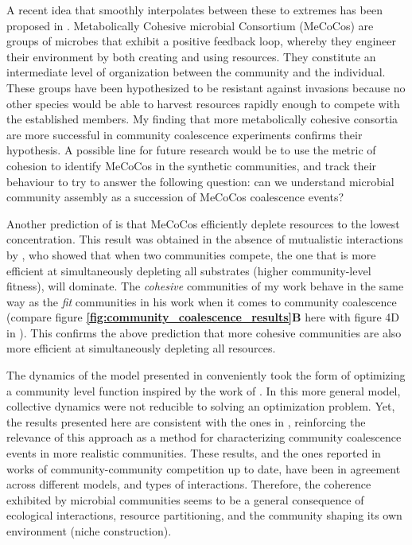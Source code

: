 \documentclass[titlepage,11pt]{article}
\begin{document}
\begin{linenumbers}
			A recent idea that smoothly interpolates between these to extremes has been proposed in \citep{Pascual-Garcia2020}. Metabolically Cohesive microbial Consortium (MeCoCos) are groups of microbes that exhibit a positive feedback loop, whereby they engineer their environment by both creating and using resources. They constitute an intermediate level of organization between the community and the individual. These groups have been hypothesized to be resistant against invasions because no other species would be able to harvest resources rapidly enough to compete with the established members. My finding that more metabolically cohesive consortia are more successful in community coalescence experiments confirms their hypothesis. A possible line for future research would be to use the metric of cohesion to identify MeCoCos in the synthetic communities, and track their behaviour to try to answer the following question:  can we understand microbial community assembly as a succession of MeCoCos coalescence events?\par 
			Another prediction of \citet{Pascual-Garcia2020} is that MeCoCos efficiently deplete resources to the lowest concentration. This result was obtained in the absence of mutualistic interactions by \citet{Tikhonov2016}, who showed that when two communities compete, the one that is more efficient at simultaneously depleting all substrates (higher community-level fitness), will dominate.  The \textit{cohesive} communities of my work behave in the same way as the \textit{fit} communities in his work when it comes to community coalescence (compare figure \textbf{\ref{fig:community_coalescence_results}B} here with figure 4D in \citet{Tikhonov2016}). This confirms the above prediction that more cohesive communities are also more efficient at simultaneously depleting all resources.\par
			The dynamics of the model presented in \citet{Tikhonov2016} conveniently took the form of optimizing a community level function inspired by the work of \citet{Arthur1969}. In this more general model, collective dynamics were not reducible to solving an optimization problem. Yet, the results presented here are consistent with the ones in \citet{Tikhonov2016}, reinforcing the relevance of this approach as a method for characterizing community coalescence events in more realistic communities. These results, and the ones reported in works of community-community competition up to date, have been in agreement across different models, and types of interactions. Therefore, the coherence exhibited by microbial communities seems to be a general consequence of ecological interactions, resource partitioning, and the community shaping its own environment (niche construction).\par

\end{linenumbers}
\end{document}

